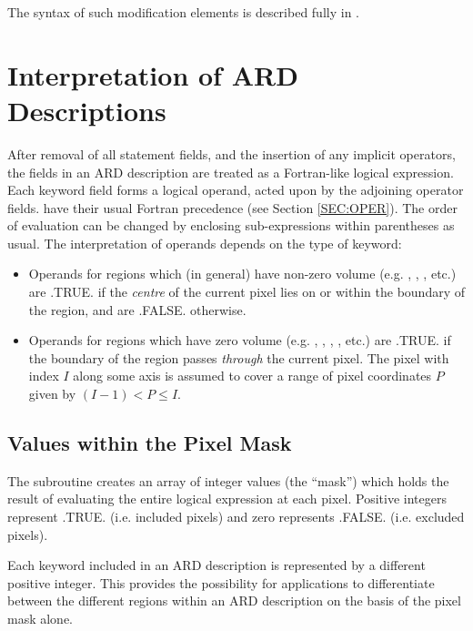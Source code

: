 The syntax of such modification elements is described fully in .

\section{Interpretation of ARD Descriptions}
After removal of all statement fields, and the insertion of any implicit 
operators, the fields in an ARD description are treated as a Fortran-like
logical expression. Each keyword field forms a logical operand, acted upon by
the adjoining operator fields.  have their usual Fortran precedence
(see Section \ref{SEC:OPER}). The order of evaluation can be changed by
enclosing sub-expressions within parentheses as usual. The interpretation of
operands depends on the type of keyword: 

\begin{itemize}

\item Operands for regions which (in general) have non-zero volume (e.g.
,
, , etc.) are .TRUE. if the {\em centre} of the current pixel lies on or
within the boundary of the region, and are .FALSE. otherwise. 

\item Operands for regions which have zero volume (e.g.
,
, , ,
etc.) are .TRUE. if the boundary of the region passes {\em through} the current
pixel. The pixel with index $I$ along some axis is assumed to cover a range of
pixel coordinates $P$ given by $(I-1) < P \leq I$.

\end{itemize}

\subsection{Values within the Pixel Mask}
The  subroutine creates an array of integer values (the ``mask'') which
holds the result of evaluating the entire logical expression at each pixel.
Positive integers represent .TRUE. (i.e. included pixels) and zero represents
.FALSE. (i.e. excluded pixels). 

Each keyword included in an ARD description is represented by a different
positive integer. This provides the possibility for applications to
differentiate between the different regions within an ARD description on the
basis of the pixel mask alone. 

